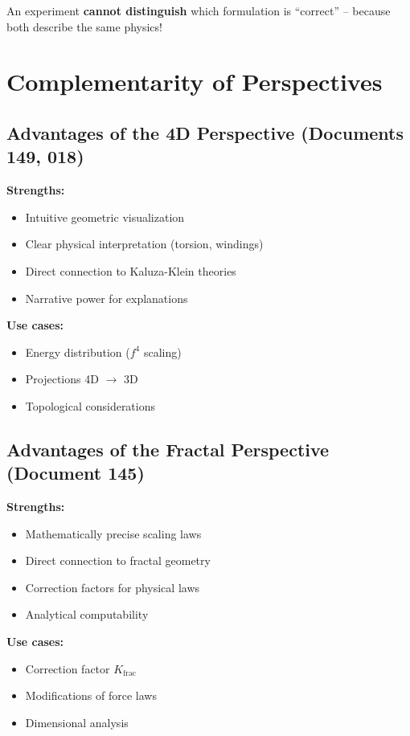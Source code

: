{\begin{important}
		An experiment \textbf{cannot distinguish} which formulation is \enquote{correct} -- because both describe the same physics!
	\end{important}
	
	\section{Complementarity of Perspectives}
	
	\subsection{Advantages of the 4D Perspective (Documents 149, 018)}
	
	\textbf{Strengths:}
	\begin{itemize}
		\item Intuitive geometric visualization
		\item Clear physical interpretation (torsion, windings)
		\item Direct connection to Kaluza-Klein theories
		\item Narrative power for explanations
	\end{itemize}
	
	\textbf{Use cases:}
	\begin{itemize}
		\item Energy distribution ($f^4$ scaling)
		\item Projections 4D $\to$ 3D
		\item Topological considerations
	\end{itemize}
	
	\subsection{Advantages of the Fractal Perspective (Document 145)}
	
	\textbf{Strengths:}
	\begin{itemize}
		\item Mathematically precise scaling laws
		\item Direct connection to fractal geometry
		\item Correction factors for physical laws
		\item Analytical computability
	\end{itemize}
	
	\textbf{Use cases:}
	\begin{itemize}
		\item Correction factor $K_{\text{frac}}$
		\item Modifications of force laws
		\item Dimensional analysis
	\end{itemize}
	
}
